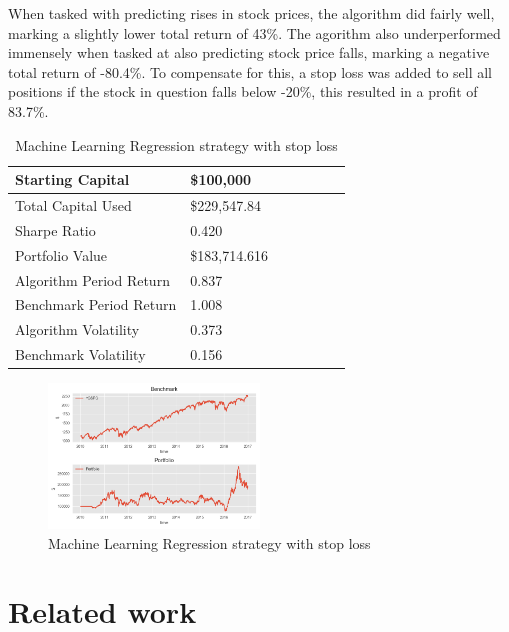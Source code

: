 \documentclass[times]{jtitauth}
\begin{document}
When tasked with predicting rises in stock prices, the algorithm did fairly well, marking a slightly lower total return of 43\%. The agorithm also underperformed immensely when tasked at also predicting stock price falls, marking a negative total return of -80.4\%. To compensate for this, a stop loss was added to sell all positions if the stock in question falls below -20\%, this resulted in a profit of 83.7\%.

\begin{table}[!hbp]
    \centering
        \begin{tabular}{ | l | l | l | | l | l | l | p{5cm} |}
        \hline
        Starting Capital & \$100,000 \\ \hline
        Total Capital Used & \$229,547.84 \\ \hline
        Sharpe Ratio & 0.420 \\ \hline
        Portfolio Value & \$183,714.616 \\ \hline
        Algorithm Period Return & 0.837 \\ \hline
        Benchmark Period Return & 1.008 \\ \hline
        Algorithm Volatility & 0.373 \\ \hline
        Benchmark Volatility & 0.156 \\
        \hline
        \end{tabular}
    \caption{Machine Learning Regression strategy with stop loss}
\end{table}

\begin{figure}[!hbp]
\includegraphics[width=0.5\textwidth]{MLR-Portfolio-Benchmark-Stop-Loss.png}
\caption{Machine Learning Regression strategy with stop loss}
\end{figure}

\section{Related work}
\end{document}
